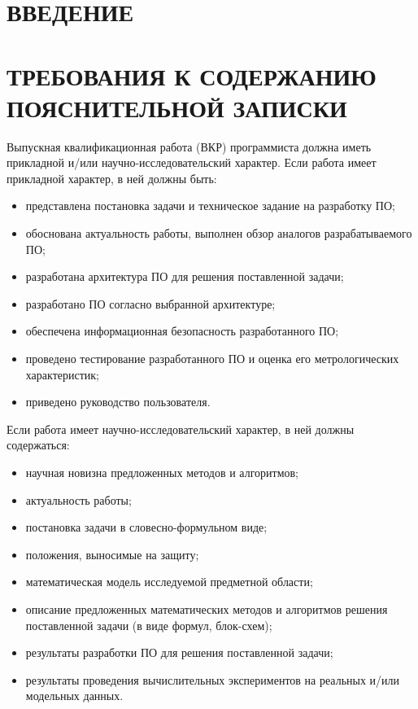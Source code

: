 \documentclass[14pt]{extarticle}
\begin{document}
\renewcommand{\contentsname}{\rucontentsname}
\tableofcontents

\section*[ВВЕДЕНИЕ]{ВВЕДЕНИЕ}

\section{ТРЕБОВАНИЯ К СОДЕРЖАНИЮ ПОЯСНИТЕЛЬНОЙ ЗАПИСКИ}

Выпускная квалификационная работа (ВКР) программиста должна иметь прикладной и/или научно-исследовательский характер. Если работа имеет прикладной характер, в ней должны быть:
\begin{itemize}[label=-]
	\item представлена постановка задачи и техническое задание на разработку ПО;
	\item обоснована актуальность работы, выполнен обзор аналогов разрабатываемого ПО;
	\item разработана архитектура ПО для решения поставленной задачи;
	\item разработано ПО согласно выбранной архитектуре;	
	\item обеспечена информационная безопасность разработанного ПО;
	\item проведено тестирование разработанного ПО и оценка его метрологических характеристик;
	\item приведено руководство пользователя.
\end{itemize}

Если работа имеет научно-исследовательский характер, в ней должны содержаться:
\begin{itemize}[label=-]
	\item научная новизна предложенных методов и алгоритмов;
	\item актуальность работы;
	\item постановка задачи в словесно-формульном виде;
	\item положения, выносимые на защиту;
	\item математическая модель исследуемой предметной области;
	\item описание предложенных математических методов и алгоритмов решения поставленной задачи (в виде формул, блок-схем);
	\item результаты разработки ПО для решения поставленной задачи;
	\item результаты проведения вычислительных экспериментов на реальных и/или модельных данных.
\end{itemize}
\end{document}
